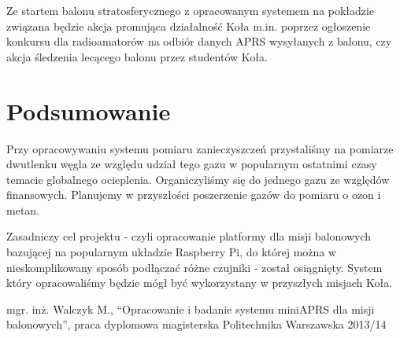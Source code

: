 \documentclass[a4paper,12pt]{article}
\begin{document}
Ze startem balonu stratosferycznego z opracowanym systemem na pokładzie związana będzie akcja promująca działalność Koła m.in. poprzez ogłoszenie konkursu dla radioamatorów na odbiór danych APRS wysyłanych z balonu, czy akcja śledzenia lecącego balonu przez studentów Koła.

\section{Podsumowanie}

Przy opracowywaniu systemu pomiaru zanieczyszczeń przystaliśmy na pomiarze dwutlenku węgla ze względu udział tego gazu w popularnym ostatnimi czasy temacie globalnego ocieplenia. Organiczyliśmy się do jednego gazu ze względów finansowych. Planujemy w przyszłości poszerzenie gazów do pomiaru o ozon i metan.

Zasadniczy cel projektu - czyli opracowanie platformy dla misji balonowych bazującej na popularnym układzie Raspberry Pi, do której można w nieskomplikowany sposób podłączać różne czujniki - został osiągnięty. System który opracowaliśmy będzie mógł być wykorzystany w przyszłych misjach Koła.


\begin{thebibliography}{[1]}

 mgr. inż. Walczyk M., ``Opracowanie i badanie systemu miniAPRS dla misji balonowych'', praca dyplomowa magisterska Politechnika Warszawska 2013/14
\end{thebibliography}



\label{ENDOFDOC}
\end{document}
